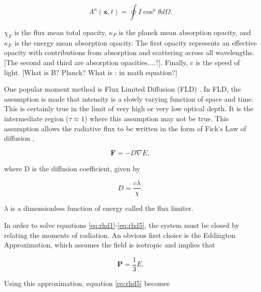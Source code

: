 \begin{equation}
A^n(\mathbf{x},t) = \oint I \cos^{n}{\theta}d\Omega.
\end{equation}

$\chi_F$ is the flux mean total opacity, $\kappa_P$ is the planck mean absorption opacity, and $\kappa_E$ is the energy mean absorption opacity. The first opacity represents an effective opacity with contributions from absorption and scattering across all wavelengths. [The second and third are absorption opacities....?]. Finally, c is the speed of light. [What is B? Planck? What is : in math equation?]


One popular moment method is Flux Limited Diffusion (FLD) \citep{almeWilson74,levermorePomraning81,pomraning83,meliaZylstra91,anileRomano92}. In FLD, the assumption is made that intensity is a slowly varying function of space and time. This is certainly true in the limit of very high or very low optical depth. It is the intermediate region ($\tau \approx 1$) where this assumption may not be true. This assumption allows the radiative flux to be written in the form of Fick's Law of diffusion \citep{livermorePomraning81},

\begin{equation}
\label{eq:fluxfdiffusion}
\mathbf{F} = -D\nabla E,
\end{equation}

where D is the diffusion coefficient, given by

\begin{equation}
\label{eq:diffusioncoeff}
D = \frac{c\lambda}{\chi}.
\end{equation}

$\lambda$ is a dimensionless function of energy called the flux limiter.

In order to solve equations \ref{eq:rhd1}-\ref{eq:rhd5}, the system must be closed by relating the moments of radiation. An obvious first choice is the Eddington Approximation, which assumes the field is isotropic and implies that

\begin{equation}
\label{eq:eddingtonapprox}
\mathbf{P} = \frac{1}{3}E.
\end{equation}

Using this approximation, equation \ref{eq:rhd5} becomes

